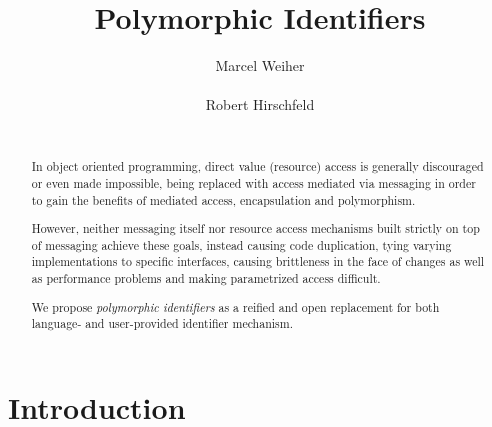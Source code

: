 \documentclass[preprint,authoryear]{acm_proc_article-sp}
\begin{document}



\title{Polymorphic Identifiers}

\author{
\alignauthor Marcel Weiher\\
       \\
\alignauthor Robert Hirschfeld\\
       \\
       \email{}
}

\maketitle

\begin{abstract}

In object oriented programming, direct value (resource) access is generally discouraged or 
even made impossible, being replaced with access mediated via messaging in order to
gain the benefits of mediated access, encapsulation and polymorphism.

However, neither messaging itself nor resource access mechanisms built strictly on top
of messaging achieve these goals, instead causing code duplication, tying varying 
implementations to specific interfaces, causing brittleness in the face of changes as well
as performance problems and making parametrized access difficult.

We propose {\em polymorphic identifiers} as a reified and open replacement for both
language- and user-provided identifier mechanism. 


\end{abstract}


\setlength{\epigraphrule}{0pt}


\section{Introduction}
\end{document}
